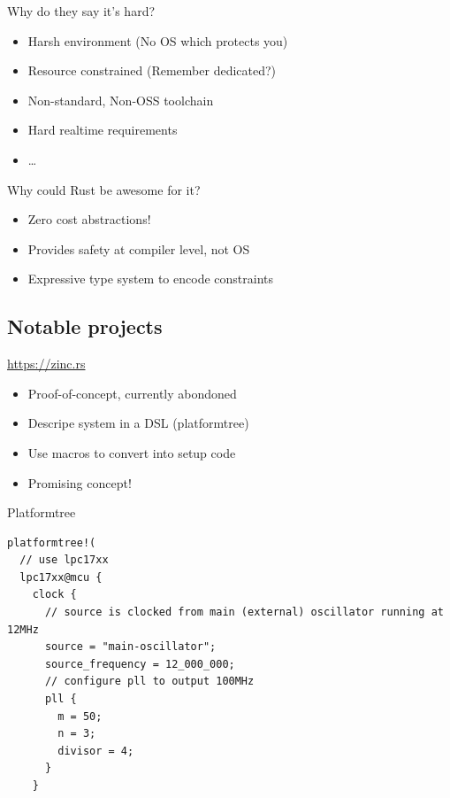 \documentclass[aspectratio=1610,14pt,t]{beamer}
\begin{document}
\begin{frame}[c]{Why do they say it's hard?}
  \begin{itemize}
    \item Harsh environment (No OS which protects you)
    \item Resource constrained (Remember dedicated?)
    \item Non-standard, Non-OSS toolchain
    \item Hard realtime requirements
    \item \ldots
  \end{itemize}
\end{frame}

\begin{frame}[c]{Why could Rust be awesome for it?}
  \begin{itemize}
    \item Zero cost abstractions!
    \item Provides safety at compiler level, not OS
    \item Expressive type system to encode constraints
  \end{itemize}
\end{frame}

\subsection{Notable projects}

\begin{frame}[c]{\url{https://zinc.rs}}
  \begin{itemize}
      \item Proof-of-concept, currently abondoned
      \item Descripe system in a DSL (platformtree)
      \item Use macros to convert into setup code
      \item Promising concept!
  \end{itemize}
\end{frame}

\begin{frame}[c,fragile]{Platformtree}
  \begin{verbatim}
platformtree!(
  // use lpc17xx
  lpc17xx@mcu {
    clock {
      // source is clocked from main (external) oscillator running at 12MHz
      source = "main-oscillator";
      source_frequency = 12_000_000;
      // configure pll to output 100MHz
      pll {
        m = 50;
        n = 3;
        divisor = 4;
      }
    }
  \end{verbatim}
\end{frame}
\end{document}
